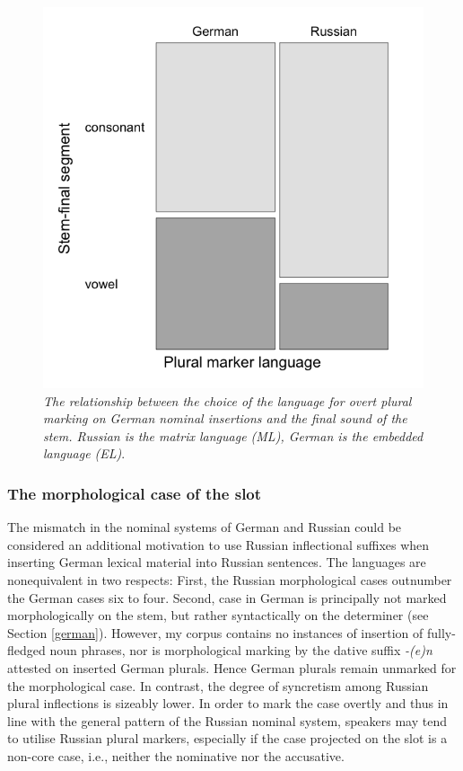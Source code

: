 \begin{figure} %
	\centering
	    	\includegraphics[scale=0.5]{figures/6-Figure_3.png}	
	\vspace{2mm}
\caption{\textit{The relationship between the choice of the language for overt plural marking on German nominal insertions and the final sound of the stem. Russian is the matrix language (ML), German is the embedded language (EL)}.}\label{fig:6:3}
\end{figure}

\subsubsection{The morphological case of the slot}

The mismatch in the nominal systems of German and Russian could be considered an additional motivation to use Russian inflectional suffixes when inserting German lexical material into Russian sentences. The  languages are nonequivalent in two respects: First, the Russian morphological cases outnumber the German cases six to four. Second, case in German is principally not marked morphologically on the stem, but rather syntactically on the determiner (see Section \ref{german}). However, my corpus contains no instances of insertion of fully-fledged noun phrases, nor is morphological marking by the dative suffix \textit{-(e)n} attested on inserted German plurals. Hence German plurals remain unmarked for the morphological case. In contrast, the degree of syncretism among Russian plural inflections is sizeably lower. In order to mark the case overtly and thus in line with the general pattern of the Russian nominal system, speakers may tend to utilise Russian plural markers, especially if the case projected on the slot is a non-core case, i.e., neither the nominative nor the accusative.


